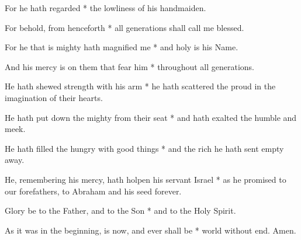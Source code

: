 \begin{multicols}{2}
	For he hath regarded * the lowliness of his handmaiden.
	
	For behold, from henceforth * all generations shall call me blessed.
	
	For he that is mighty hath magnified me * and holy is his Name.
	
	And his mercy is on them that fear him * throughout all generations.
	
	He hath shewed strength with his arm * he hath scattered the proud in the imagination of their hearts.
	
	He hath put down the mighty from their seat * and hath exalted the humble and meek.
	
	He hath filled the hungry with good things * and the rich he hath sent empty away.
	
	He, remembering his mercy, hath holpen his servant Israel * as he promised to our forefathers, to Abraham and his seed forever.
	
	Glory be to the Father, and to the Son * and to the Holy Spirit.
	
	As it was in the beginning, is now, and ever shall be * world without end. Amen.
\end{multicols}